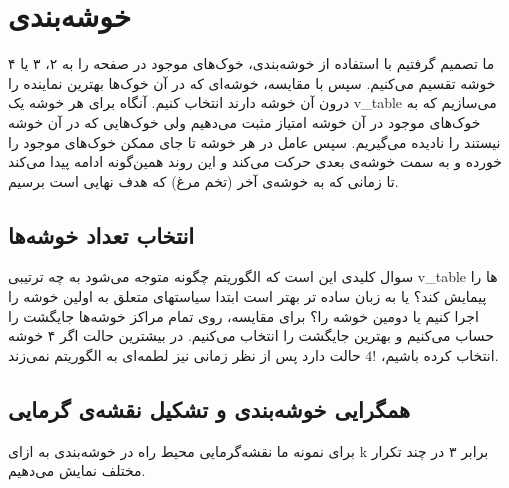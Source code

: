 \documentclass[11pt, a4paper, oneside]{report}
\begin{document}
	 \section{خوشه‌بندی}
	ما تصمیم گرفتیم با استفاده از خوشه‌بندی، خوک‌های موجود در صفحه را به ۲، ۳ یا ۴ خوشه تقسیم  می‌کنیم. سپس با مقایسه، خوشه‌ای که در آن خوک‌ها بهترین نماینده را درون آن خوشه دارند انتخاب کنیم. آنگاه برای هر خوشه یک v\_table می‌سازیم که به خوک‌های موجود در آن خوشه امتیاز مثبت می‌دهیم ولی خوک‌هایی که در آن خوشه نیستند را نادیده می‌گیریم. سپس عامل در هر خوشه  تا جای ممکن خوک‌های موجود را خورده و به سمت خوشه‌ی بعدی حرکت می‌کند و این روند همین‌گونه ادامه پیدا می‌کند تا زمانی که به خوشه‌ی آخر (تخم مرغ) که هدف نهایی است برسیم.
	\subsection{انتخاب تعداد خوشه‌ها}
	سوال کلیدی این است که الگوریتم چگونه متوجه می‌شود به چه ترتیبی v\_table ها را پیمایش کند؟ یا به زبان ساده تر بهتر است ابتدا سیاستهای متعلق به اولین خوشه را اجرا کنیم یا دومین خوشه  را؟
	برای مقایسه، روی تمام مراکز خوشه‌ها جایگشت را حساب می‌کنیم  و بهترین جایگشت را انتخاب می‌کنیم. در بیشترین حالت اگر ۴ خوشه  انتخاب کرده باشیم، $4!$ حالت دارد پس از نظر زمانی نیز لطمه‌ای به الگوریتم نمی‌زند.
	
	\subsection{همگرایی  خوشه‌بندی و تشکیل نقشه‌‌ی گرمایی}
	برای نمونه ما نقشه‌گرمایی محیط راه در خوشه‌بندی به ازای k برابر ۳ در چند تکرار مختلف نمایش می‌دهیم.
	
\end{document}
